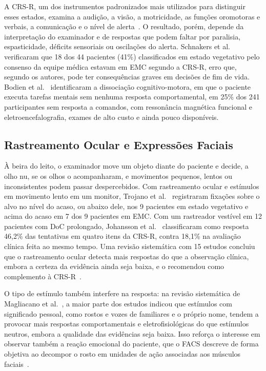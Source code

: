 \documentclass[conference,a4paper,10pt]{IEEEtran}
\begin{document}
A CRS-R, um dos instrumentos padronizados mais utilizados para distinguir esses estados, examina a audição, a visão, a motricidade, as funções oromotoras e verbais, a comunicação e o nível de alerta~\cite{GIACINO2004}. O resultado, porém, depende da interpretação do examinador e de respostas que podem faltar por paralisia, espasticidade, déficits sensoriais ou oscilações do alerta. Schnakers et al.~\cite{SCHNAKERS} verificaram que 18 dos 44 pacientes (41\%) classificados em estado vegetativo pelo consenso da equipe médica estavam em EMC segundo a CRS-R, erro que, segundo os autores, pode ter consequências graves em decisões de fim de vida. Bodien et al.~\cite{BODIEN} identificaram a dissociação cognitivo-motora, em que o paciente executa tarefas mentais sem nenhuma resposta comportamental, em 25\% dos 241 participantes sem resposta a comandos, com ressonância magnética funcional e eletroencefalografia, exames de alto custo e ainda pouco disponíveis.

\subsection{Rastreamento Ocular e Expressões Faciais}

À beira do leito, o examinador move um objeto diante do paciente e decide, a olho nu, se os olhos o acompanharam, e movimentos pequenos, lentos ou inconsistentes podem passar despercebidos. Com rastreamento ocular e estímulos em movimento lento em um monitor, Trojano et al.~\cite{TROJANO} registraram fixações sobre o alvo no nível do acaso, ou abaixo dele, nos 9 pacientes em estado vegetativo e acima do acaso em 7 dos 9 pacientes em EMC. Com um rastreador vestível em 12 pacientes com DoC prolongado, Johansson et al.~\cite{JOHANSSON} classificaram como resposta 46,2\% das tentativas em quatro itens da CRS-R, contra 18,1\% na avaliação clínica feita ao mesmo tempo. Uma revisão sistemática com 15 estudos concluiu que o rastreamento ocular detecta mais respostas do que a observação clínica, embora a certeza da evidência ainda seja baixa, e o recomendou como complemento à CRS-R~\cite{ESTRANEO}.

O tipo de estímulo também interfere na resposta: na revisão sistemática de Magliacano et al.~\cite{MAGLIACANO}, a maior parte dos estudos indicou que estímulos com significado pessoal, como rostos e vozes de familiares e o próprio nome, tendem a provocar mais respostas comportamentais e eletrofisiológicas do que estímulos neutros, embora a qualidade das evidências seja baixa. Isso reforça o interesse em observar também a reação emocional do paciente, que o FACS descreve de forma objetiva ao decompor o rosto em unidades de ação associadas aos músculos faciais~\cite{EKMAN}.
\end{document}
